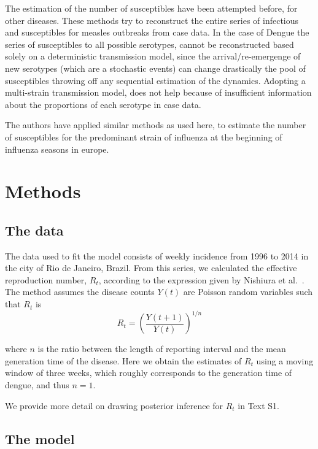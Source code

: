 The estimation of the  number of susceptibles have been attempted 
before, for other diseases\cite{bjornstad_dynamics_2002, 
wallinga_reconstruction_2003}. These methods try to reconstruct the entire 
series of infectious and susceptibles for measles 
outbreaks from case data. In the case of Dengue the 
series of susceptibles to all possible serotypes, cannot be reconstructed based 
solely on a deterministic transmission model, since the arrival/re-emergenge of 
new serotypes (which are a stochastic events) can change drastically the pool 
of susceptibles throwing off any sequential estimation of the dynamics. 
Adopting a multi-strain transmission model, does not help because of 
insufficient information about the proportions of each serotype in case data.

The authors have applied similar methods as used here, to estimate the number 
of susceptibles for the predominant strain of influenza at the beginning of  
influenza seasons in europe\cite{pone2011}.


\section*{Methods}

\subsection*{The data}

The data used to fit the model consists of weekly incidence from 1996 to 2014 
in the city of Rio de Janeiro, Brazil.
From this series, we calculated the effective reproduction number, $R_t$, 
according to the expression given by Nishiura et al.~\cite{nishiura}.
The method assumes the disease counts $Y(t)$ are Poisson random variables such 
that $R_t$ is 
\begin{equation}
 \label{eq:Rt}
 R_t = \left(\frac{Y(t + 1)}{Y(t)}\right)^{1/n}
\end{equation}
 
where $n$ is the ratio between the length of reporting interval and the mean 
generation time of the disease.
Here we obtain the estimates of $R_t$ using a moving window of three weeks, 
which roughly corresponds to the generation time of dengue, and thus $n = 1$.

We provide more detail on drawing posterior inference for $R_t$ in Text S1.

\subsection*{The model}

